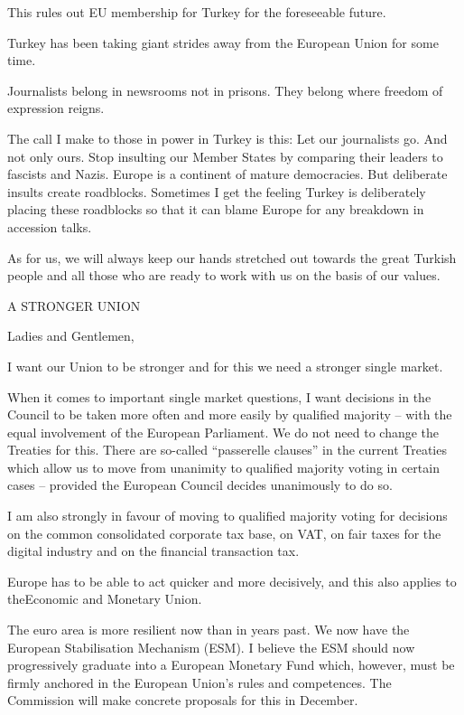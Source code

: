 \documentclass[a4paper,11pt]{article}
\begin{document}
This rules out EU membership for Turkey for the foreseeable future.

Turkey has been taking giant strides away from the European Union for some time.

Journalists belong in newsrooms not in prisons. They belong where freedom of expression reigns.

The call I make to those in power in Turkey is this: Let our journalists go. And not only ours. Stop insulting our Member States by comparing their leaders to fascists and Nazis. Europe is a continent of mature democracies. But deliberate insults create roadblocks. Sometimes I get the feeling Turkey is deliberately placing these roadblocks so that it can blame Europe for any breakdown in accession talks.

As for us, we will always keep our hands stretched out towards the great Turkish people and all those who are ready to work with us on the basis of our values.

 

 

A STRONGER UNION

Ladies and Gentlemen,

I want our Union to be stronger and for this we need a stronger single market.

When it comes to important single market questions, I want decisions in the Council to be taken more often and more easily by qualified majority – with the equal involvement of the European Parliament. We do not need to change the Treaties for this. There are so-called “passerelle clauses” in the current Treaties which allow us to move from unanimity to qualified majority voting in certain cases – provided the European Council decides unanimously to do so.

I am also strongly in favour of moving to qualified majority voting for decisions on the common consolidated corporate tax base, on VAT, on fair taxes for the digital industry and on the financial transaction tax.

 

Europe has to be able to act quicker and more decisively, and this also applies to theEconomic and Monetary Union.

The euro area is more resilient now than in years past. We now have the European Stabilisation Mechanism (ESM). I believe the ESM should now progressively graduate into a European Monetary Fund which, however, must be firmly anchored in the European Union's rules and competences. The Commission will make concrete proposals for this in December.
\end{document}
